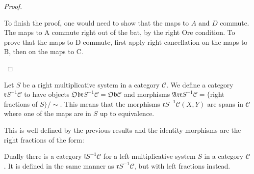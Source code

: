 \begin{proof}
        \begin{center}
            \begin{minipage}[c]{0.3\textwidth}
            \end{minipage}
            \begin{minipage}[c]{0.5\textwidth}
                To finish the proof, one would need to show that the maps to $A$ and $D$ commute. The maps to A commute right out of the bat, by the right Ore condition. To prove that the maps to D commute, first apply right cancellation on the maps to B, then on the maps to C.
            \end{minipage}
        \end{center}
    \end{proof}

    \begin{definition}
        Let $S$ be a right multiplicative system in a category $\mathcal{C}$. We define a category $\mathfrak{r}S^{-1}\mathcal{C}$ to have objects $\mathfrak{Obr}S^{-1}\mathcal{C}=\mathfrak{Ob}\mathcal{C}$ and morphisms $\mathfrak{Arr}S^{-1}\mathcal{C} = \{$right fractions of $S\}/\sim$. This means that the morphisms $\mathfrak{r}S^{-1}\mathcal{C}(X,Y)$ are spans in $\mathcal{C}$ where one of the maps are in $S$ up to equivalence.
        \begin{center}
        \end{center}
        This is well-defined by the previous results and the identity morphisms are the right fractions of the form:
        \begin{center}
        \end{center}
    \end{definition}

    \begin{remark}
        Dually there is a category $\mathfrak{l}S^{-1}\mathcal{C}$ for a left multiplicative system $S$ in a category $\mathcal{C}$. It is defined in the same manner as $\mathfrak{r}S^{-1}\mathcal{C}$, but with left fractions instead.
    \end{remark}

